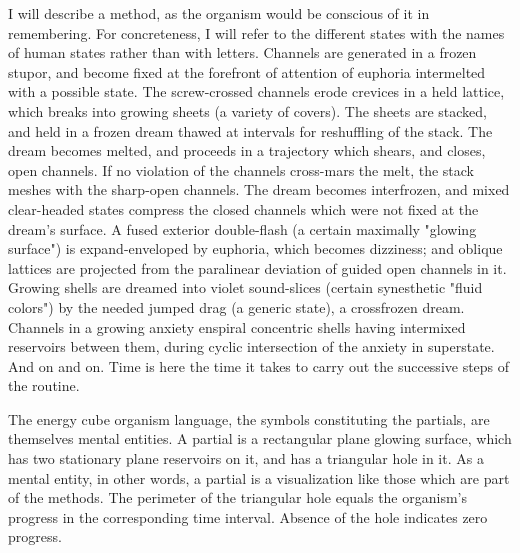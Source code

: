 \documentclass[10pt,twoside]{memoir}
\begin{document}
\begin{enumerate}
{\begin{enumerate}
\begin{sysrules}
\begin{sysrules}
\begin{sysrules}
\begin{sysrules}
{\begin{enumerate}
I will describe a method, as the organism would be conscious of it in 
remembering. For concreteness, I will refer to the different states with the 
names of human states rather than with letters. Channels are generated in a 
frozen stupor, and become fixed at the forefront of attention of euphoria 
intermelted with a possible state. The screw-crossed channels erode crevices 
in a held lattice, which breaks into growing sheets (a variety of covers). The 
sheets are stacked, and held in a frozen dream thawed at intervals for 
reshuffling of the stack. The dream becomes melted, and proceeds in a 
trajectory which shears, and closes, open channels. If no violation of the 
channels cross-mars the melt, the stack meshes with the sharp-open channels. 
The dream becomes interfrozen, and mixed clear-headed states compress the 
closed channels which were not fixed at the dream's surface. A fused 
exterior double-flash (a certain maximally "glowing surface") is 
expand-enveloped by euphoria, which becomes dizziness; and oblique 
lattices are projected from the paralinear deviation of guided open channels 
in it. Growing shells are dreamed into violet sound-slices (certain synesthetic 
"fluid colors") by the needed jumped drag (a generic state), a crossfrozen 
dream. Channels in a growing anxiety enspiral concentric shells having 
intermixed reservoirs between them, during cyclic intersection of the anxiety 
in superstate. And on and on. Time is here the time it takes to carry out the 
successive steps of the routine. 

The energy cube organism language, the symbols constituting the 
partials, are themselves mental entities. A partial is a rectangular plane 
glowing surface, which has two stationary plane reservoirs on it, and has a 
triangular hole in it. As a mental entity, in other words, a partial is a 
visualization like those which are part of the methods. The perimeter of the 
triangular hole equals the organism's progress in the corresponding time 
interval. Absence of the hole indicates zero progress. 


\end{enumerate}}
\end{sysrules}
\end{sysrules}
\end{sysrules}
\end{sysrules}
\end{enumerate}}
\end{enumerate}
\end{document}
